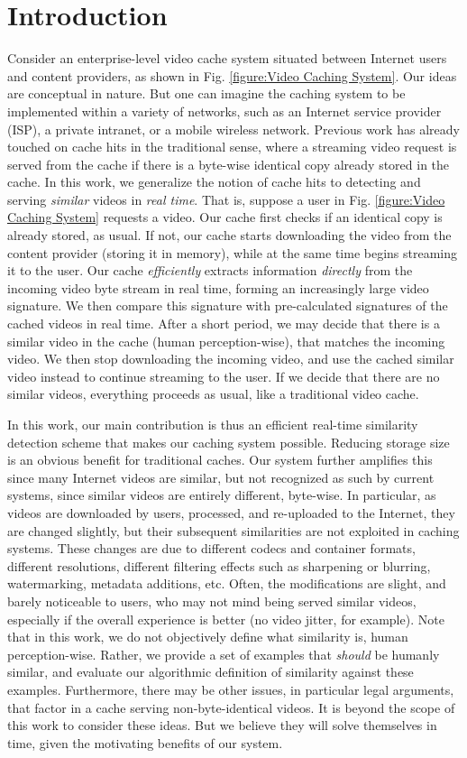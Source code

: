 \documentclass{article}
\begin{document}
\section{Introduction}
Consider an enterprise-level video cache system situated between Internet users and content providers, as shown in Fig. \ref{figure:Video Caching System}. Our ideas are conceptual in nature. But one can imagine the caching system to be implemented within a variety of networks, such as an Internet service provider (ISP), a private intranet, or a mobile wireless network. Previous work has already touched on cache hits in the traditional sense, where a streaming video request is served from the cache if there is a byte-wise identical copy already stored in the cache. In this work, we generalize the notion of cache hits to detecting and serving \emph{similar} videos in \emph{real time}. That is, suppose a user in Fig. \ref{figure:Video Caching System} requests a video. Our cache first checks if an identical copy is already stored, as usual. If not, our cache starts downloading the video from the content provider (storing it in memory), while at the same time begins streaming it to the user. Our cache \emph{efficiently} extracts information \emph{directly} from the incoming video byte stream in real time, forming an increasingly large video signature. We then compare this signature with pre-calculated signatures of the cached videos in real time. After a short period, we may decide that there is a similar video in the cache (human perception-wise), that matches the incoming video. We then stop downloading the incoming video, and use the cached similar video instead to continue streaming to the user. If we decide that there are no similar videos, everything proceeds as usual, like a traditional video cache.

In this work, our main contribution is thus an efficient real-time similarity detection scheme that makes our caching system possible. Reducing storage size is an obvious benefit for traditional caches. Our system further amplifies this since many Internet videos are similar, but not recognized as such by current systems, since similar videos are entirely different, byte-wise. In particular, as videos are downloaded by users, processed, and re-uploaded to the Internet, they are changed slightly, but their subsequent similarities are not exploited in caching systems. These changes are due to different codecs and container formats, different resolutions, different filtering effects such as sharpening or blurring, watermarking, metadata additions, etc. Often, the modifications are slight, and barely noticeable to users, who may not mind being served similar videos, especially if the overall experience is better (no video jitter, for example). Note that in this work, we do not objectively define what similarity is, human perception-wise. Rather, we provide a set of examples that \emph{should} be humanly similar, and evaluate our algorithmic definition of similarity against these examples. Furthermore, there may be other issues, in particular legal arguments, that factor in a cache serving non-byte-identical videos. It is beyond the scope of this work to consider these ideas. But we believe they will solve themselves in time, given the motivating benefits of our system.
\end{document}
